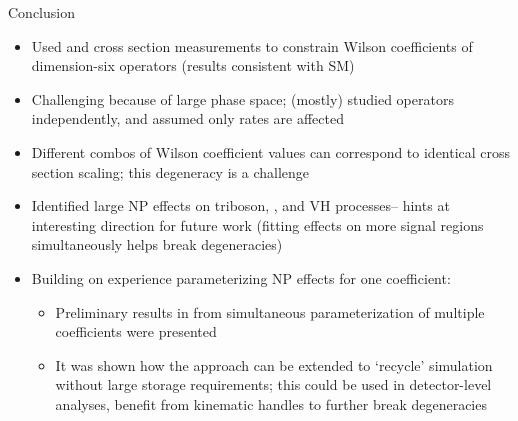 \documentclass[professionalfont,fleqn]{beamer}
\begin{document}
\begin{frame}{Conclusion}
  \footnotesize
  \begin{itemize}
    \item Used \ttW and \ttZ cross section measurements to constrain Wilson coefficients of dimension-six operators (results consistent with SM)
    \item Challenging because of large phase space; (mostly) studied operators independently, and assumed only rates are affected
    \item Different combos of Wilson coefficient values can correspond to identical cross section scaling; this degeneracy is a challenge
    \item Identified large NP effects on triboson, \ttX, and VH processes-- hints at interesting direction for future work (fitting effects on more signal regions simultaneously helps break degeneracies)
    \item Building on experience parameterizing NP effects for one coefficient:
      \begin{itemize}
  \footnotesize
        \item Preliminary results in from simultaneous parameterization of multiple coefficients were presented
        \item It was shown how the approach can be extended to `recycle' simulation without large storage requirements; this could be used in detector-level analyses, benefit from kinematic handles to further break degeneracies
      \end{itemize}
  \end{itemize}
\end{frame}

\appendix
\end{document}
